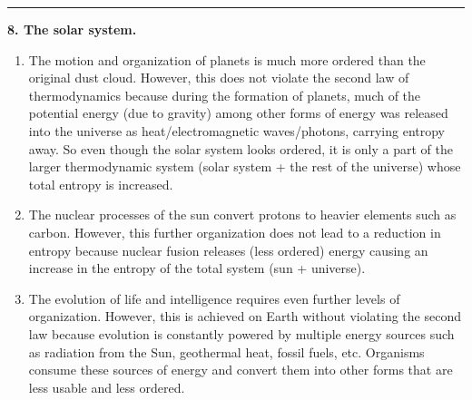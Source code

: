 \documentclass{article}
\theoremstyle{definition}
\begin{document}
\hrule

$\,$\\


\noindent \textbf{8. The solar system.}



\begin{enumerate}[label=(\alph*)]
	\item The motion and organization of planets is much more ordered than the original dust
	cloud. However, this does not violate the second law of thermodynamics because during the formation of planets, much of the potential energy (due to gravity) among other forms of energy was released into the universe as heat/electromagnetic waves/photons, carrying entropy away. So even though the solar system looks ordered, it is only a part of the larger thermodynamic system (solar system + the rest of the universe) whose total entropy is increased. 
	
	\item The nuclear processes of the sun convert protons to heavier elements such as carbon. However, this further organization does not lead to a reduction in entropy because nuclear fusion releases (less ordered) energy causing an increase in the entropy of the total system (sun + universe). 
	
	
	\item The evolution of life and intelligence requires even further levels of organization. However, this is achieved on Earth without violating the second law because evolution is constantly powered by multiple energy sources such as radiation from the Sun, geothermal heat, fossil fuels, etc. Organisms consume these sources of energy and convert them into other forms that are less usable and less ordered. 
\end{enumerate}
\end{document}
